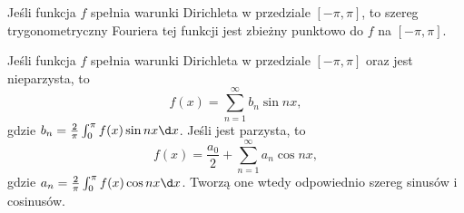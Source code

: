 \begin{theorem}
    Jeśli funkcja $f$ spełnia warunki Dirichleta w przedziale $[-\pi, \pi]$, to szereg trygonometryczny Fouriera tej funkcji jest zbieżny punktowo do $f$ na $[-\pi, \pi]$.
\end{theorem}

\begin{remark}
    Jeśli funkcja $f$ spełnia warunki Dirichleta w przedziale $[-\pi, \pi]$ oraz jest nieparzysta, to
    \[ f(x) = \sum_{n=1}^\infty b_n\sin nx, \]
    gdzie $b_n = \frac{2}{\pi}\int_0^\pi f(x)\sin nx \d x$. Jeśli jest parzysta, to
    \[ f(x) = \frac{a_0}{2} + \sum_{n=1}^\infty a_n\cos nx, \]
    gdzie $a_n = \frac{2}{\pi}\int_0^\pi f(x)\cos nx \d x$. Tworzą one wtedy odpowiednio szereg sinusów i cosinusów.
\end{remark}

